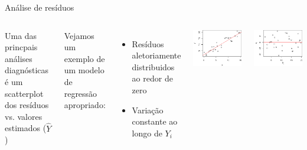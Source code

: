 \documentclass{beamer}\usepackage[]{graphicx}\usepackage[]{color}
\newenvironment{knitrout}{}{} %
\renewenvironment{knitrout}{\setlength{\topsep}{0mm}}{}
\begin{document}
\begin{frame}{Análise de resíduos}

\begin{columns}[t]

\small

Uma das princpais análises diagnósticas é um scatterplot dos resíduos vs.  valores estimados ($\hat Y$) \pause

\bigskip

Vejamos um exemplo de um modelo de regressão apropriado: 
\begin{itemize}
\item Resíduos aletoriamente distribuidos ao redor de zero 
\item Variação constante ao longo de $Y_i$
\end{itemize}


\begin{knitrout}
\color{fgcolor}
\includegraphics[width=1\linewidth]{figure/reg1-1} 

\includegraphics[width=1\linewidth]{figure/reg1-2} 


\end{knitrout}
\end{columns}
\end{frame}
\end{document}
